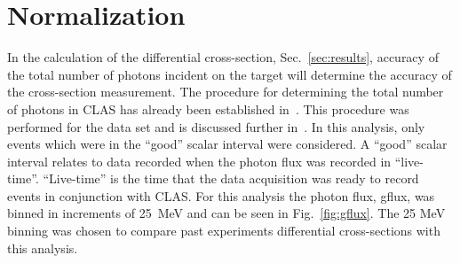 \section{\label{sec:level1}Normalization}
In the calculation of the differential cross-section, Sec.~\ref{sec:results}, accuracy of the total number of photons incident on the target will determine the accuracy of the cross-section measurement. The procedure for determining the total number of photons in CLAS has already been established in~\cite{clas.gflux}. This procedure was performed for the  data set and is discussed further in~\cite{clas.g12.note}. In this analysis, only events which were in the ``good'' scalar interval were considered. A ``good'' scalar interval relates to data recorded when the photon flux was recorded in ``live-time''. ``Live-time'' is the time that the data acquisition was ready to record events in conjunction with CLAS. For this analysis the photon flux, gflux, was binned in increments of 25~MeV and can be seen in Fig.~\ref{fig:gflux}. The 25 MeV binning was chosen to compare past experiments differential cross-sections with this analysis. 